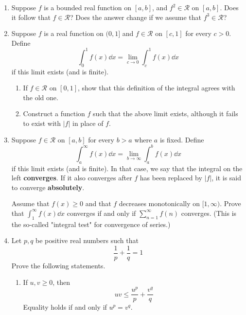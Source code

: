 \documentclass[../psets.tex]{subfiles}
\begin{document}
\begin{enumerate}[label={\textbf{\arabic*.}}]
    \item Suppose $f$ is a bounded real function on $[a,b]$, and $f^2\in\mathscr{R}$ on $[a,b]$. Does it follow that $f\in\mathscr{R}$? Does the answer change if we assume that $f^3\in\mathscr{R}$?
    \item Suppose $f$ is a real function on $(0,1]$ and $f\in\mathscr{R}$ on $[c,1]$ for every $c>0$. Define
    \begin{equation*}
        \int_0^1f(x)\dd{x} = \lim_{c\to 0}\int_c^1f(x)\dd{x}
    \end{equation*}
    if this limit exists (and is finite).
    \begin{enumerate}
        \item If $f\in\mathscr{R}$ on $[0,1]$, show that this definition of the integral agrees with the old one.
        \item Construct a function $f$ such that the above limit exists, although it fails to exist with $|f|$ in place of $f$.
    \end{enumerate}
    \item Suppose $f\in\mathscr{R}$ on $[a,b]$ for every $b>a$ where $a$ is fixed. Define
    \begin{equation*}
        \int_a^\infty f(x)\dd{x} = \lim_{b\to\infty}\int_a^bf(x)\dd{x}
    \end{equation*}
    if this limit exists (and is finite). In that case, we say that the integral on the left \textbf{converges}. If it also converges after $f$ has been replaced by $|f|$, it is said to converge \textbf{absolutely}.\par
    Assume that $f(x)\geq 0$ and that $f$ decreases monotonically on $[1,\infty)$. Prove that $\int_1^\infty f(x)\dd{x}$ converges if and only if $\sum_{n=1}^\infty f(n)$ converges. (This is the so-called "integral test" for convergence of series.)
    \item Let $p,q$ be positive real numbers such that
    \begin{equation*}
        \frac{1}{p}+\frac{1}{q} = 1
    \end{equation*}
    Prove the following statements.
    \begin{enumerate}
        \item If $u,v\geq 0$, then
        \begin{equation*}
            uv \leq \frac{u^p}{p}+\frac{v^q}{q}
        \end{equation*}
        Equality holds if and only if $u^p=v^q$.

\end{enumerate}
\end{enumerate}
\end{document}
